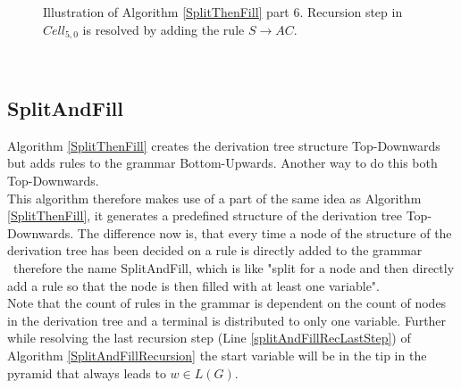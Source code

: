 \begin{figure} [h]
\begin{minipage}{6in}
{
		}
	\end{minipage}
	\caption{Illustration of Algorithm \ref{SplitThenFill} part 6. Recursion step in $Cell_{5,0}$ is  resolved by adding the rule $S\rightarrow AC$.}
	\label{IllustrationAlgorithmSplitThenFillPart6}
\end{figure}\\

\clearpage

\subsection{SplitAndFill}
Algorithm \ref{SplitThenFill} creates the derivation tree structure Top-Downwards but adds rules to the grammar Bottom-Upwards. Another way to do this both Top-Downwards.\\
This algorithm therefore makes use of a part of the same idea as Algorithm \ref{SplitThenFill}, it generates a predefined structure of the derivation tree Top-Downwards. The difference now is, that every time a node of the structure of the derivation tree has been decided on a rule is directly added to the grammar \textendash~therefore the name SplitAndFill, which is like "split for a node and then directly add a rule so that the node is then filled with at least one variable". \\
Note that the count of rules in the grammar is dependent on the count of nodes in the derivation tree and a terminal is distributed to only one variable. Further while resolving the last recursion step (Line \ref{splitAndFillRecLastStep}) of Algorithm \ref{SplitAndFillRecursion} the start variable will be in the tip in the pyramid that always leads to $w \in L(G)$.\\

